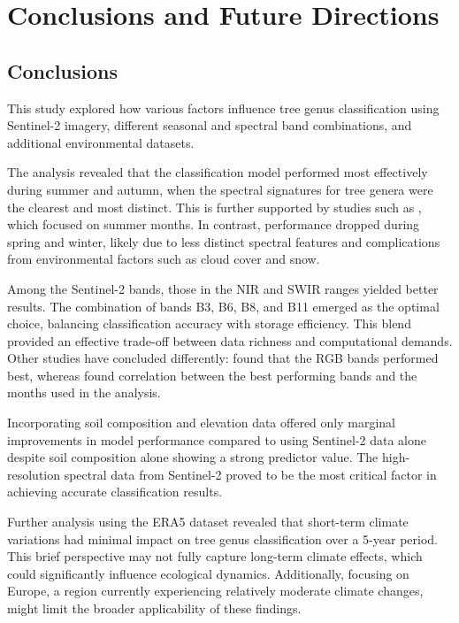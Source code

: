 \chapter{Conclusions and Future Directions}
\label{chapter:conclusion}
\section{Conclusions}


This study explored how various factors influence tree genus classification using Sentinel-2 imagery, different seasonal and spectral band combinations, and additional environmental datasets.

The analysis revealed that the classification model performed most effectively during summer and autumn, when the spectral signatures for tree genera were the clearest and most distinct. This is further supported by studies such as \cite{belgium_classification}, which focused on summer months. In contrast, performance dropped during spring and winter, likely due to less distinct spectral features and complications from environmental factors such as cloud cover and snow.

Among the Sentinel-2 bands, those in the NIR and SWIR ranges yielded better results. The combination of bands B3, B6, B8, and B11 emerged as the optimal choice, balancing classification accuracy with storage efficiency. This blend provided an effective trade-off between data richness and computational demands. Other studies have concluded differently: \cite{Qingyuan} found that the RGB bands performed best, whereas \cite{Yanbiao2021} found correlation between the best performing bands and the months used in the analysis.

Incorporating soil composition and elevation data offered only marginal improvements in model performance compared to using Sentinel-2 data alone despite soil composition alone showing a strong predictor value. The high-resolution spectral data from Sentinel-2 proved to be the most critical factor in achieving accurate classification results.

Further analysis using the ERA5 dataset revealed that short-term climate variations had minimal impact on tree genus classification over a 5-year period. This brief perspective may not fully capture long-term climate effects, which could significantly influence ecological dynamics. Additionally, focusing on Europe, a region currently experiencing relatively moderate climate changes, might limit the broader applicability of these findings.


